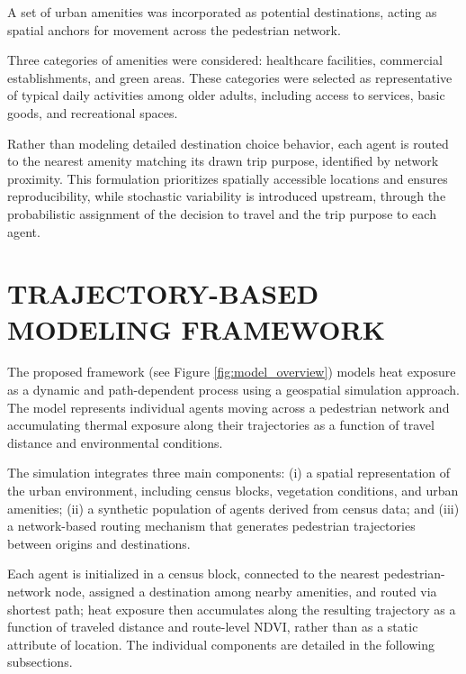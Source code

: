 \documentclass{wscpaperproc}
\theoremstyle{wsc}
\begin{document}
A set of urban amenities was incorporated as potential destinations, acting as spatial anchors for movement across the pedestrian network.

Three categories of amenities were considered: healthcare facilities, commercial establishments, and green areas. These categories were selected as representative of typical daily activities among older adults, including access to services, basic goods, and recreational spaces.

Rather than modeling detailed destination choice behavior, each agent is routed to the nearest amenity matching its drawn trip purpose, identified by network proximity. This formulation prioritizes spatially accessible locations and ensures reproducibility, while stochastic variability is introduced upstream, through the probabilistic assignment of the decision to travel and the trip purpose to each agent.


\section{TRAJECTORY-BASED MODELING FRAMEWORK}
\label{sec:methodology}


The proposed framework (see Figure \ref{fig:model_overview}) models heat exposure as a dynamic and path-dependent process using a geospatial simulation approach. The model represents individual agents moving across a pedestrian network and accumulating thermal exposure along their trajectories as a function of travel distance and environmental conditions.

The simulation integrates three main components: (i) a spatial representation of the urban environment, including census blocks, vegetation conditions, and urban amenities; (ii) a synthetic population of agents derived from census data; and (iii) a network-based routing mechanism that generates pedestrian trajectories between origins and destinations.

Each agent is initialized in a census block, connected to the nearest pedestrian-network node, assigned a destination among nearby amenities, and routed via shortest path; heat exposure then accumulates along the resulting trajectory as a function of traveled distance and route-level NDVI, rather than as a static attribute of location. The individual components are detailed in the following subsections.
\end{document}
